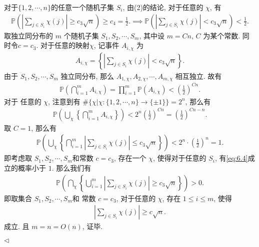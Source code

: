 \documentclass[11pt]{article}
\newenvironment{answer}[1][Solution]{\begin{trivlist}
    \item[\hskip \labelsep {\bfseries #1.}\hskip \labelsep]}{\hfill$\lhd$\end{trivlist}}
\newcommand\1{\mathds{1}}
\newcommand\PP{\mathbb{P}}
\begin{document}
\begin{answer}
\begin{enumerate}[label=(\arabic*)]
        对于$\{1,2,\cdots, n\}$的任意一个随机子集 $S_i$, 由(2)的结论, 对于任意的 $\chi$, 有
        \begin{align*}
            \PP\left(\left|\sum_{j\in S_i}\chi(j)\right| \ge c_3 \sqrt{n}\right) \ge c_4 = \frac{1}{2}. \implies \PP\left(\left|\sum_{j\in S_i}\chi(j)\right| < c_3 \sqrt{n}\right) < \frac{1}{2}.
        \end{align*}
        取独立同分布的 $m$ 个随机子集 $S_1, S_2, \cdots, S_m$, 其中设 $m = Cn$, $C$ 为某个常数. 同时令$c = c_3$. 对于任意的映射$\chi$, 记事件 $A_{i,\chi}$ 为
        \begin{align*}
            A_{i,\chi} = \left\{\left|\sum_{j\in S_i}\chi(j)\right| < c_3 \sqrt{n}\right\}.
        \end{align*}
        由于 $S_1, S_2, \cdots, S_m$ 独立同分布, 那么 $A_{1, \chi}, A_{2,\chi}, \cdots, A_{m,\chi}$ 相互独立. 故有 
        \begin{align*}
            \PP\left(\bigcap_{i=1}^m A_{i,\chi}\right)  = \prod_{i=1}^m \PP(A_{i,\chi}) < \left(\frac{1}{2}\right)^{Cn}.
        \end{align*}
        对于 任意的 $\chi$, 注意到有 $\#\{\chi | \chi:\{1,2,\cdots, n\}\to \{\pm 1\}\} = 2^n$, 那么有
        \begin{align*}
            \PP\left( \bigcup_\chi \left\{\bigcap_{i=1}^m A_{i,\chi}\right\}\right) < 2^n \left(\frac{1}{2}\right)^{Cn} = \left(\frac{1}{2}\right)^{Cn - n}.
        \end{align*}
        取 $C = 1$, 那么有 
        \begin{align*}
            \PP\left( \bigcup_\chi \left\{\bigcap_{i=1}^m\left|\sum_{j\in S_i} \chi(j)\right| \le c_3 \sqrt{n}\right\}\right) < 2^n \cdot \left(\frac{1}{2}\right)^{n} = 1.
        \end{align*}
        即考虑取 $S_1, S_2, \cdots, S_m$和常数 $c=c_3$, 存在一个 $\chi$, 使得对于任意的 $S_i$, 有\eqref{eq:6.4}成立的概率小于 $1$. 那么我们有
        \begin{align*}
            \PP\left( \bigcap_\chi \left\{\bigcup_{i=1}^m\left|\sum_{j\in S_i} \chi(j)\right| \ge c_3 \sqrt{n}\right\}\right) > 0.
        \end{align*}
        即取集合 $S_1, S_2, \cdots, S_m$和 常数 $c=c_3$, 对于任意的 $\chi$, 存在 $1\le i\le m$, 使得
        \begin{align*}
            \left|\sum_{j\in S_i}\chi(j)\right| \ge c\sqrt{n}.
        \end{align*}
        成立. 
        且 $m = n = O(n)$, 证毕.


\end{enumerate}
\end{answer}
\end{document}
